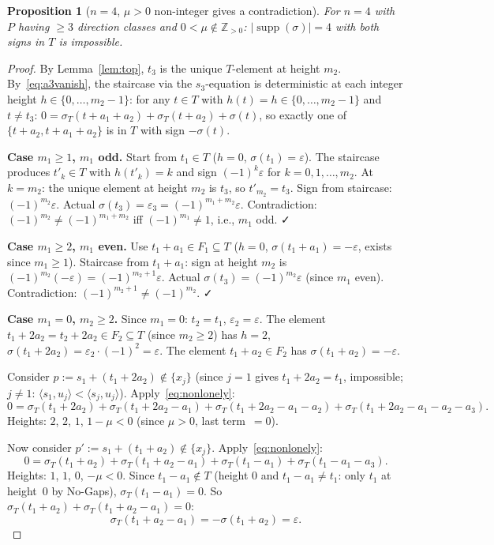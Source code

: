 \documentclass{article}
\newtheorem{prop}{Proposition}
\begin{document}
\begin{prop}[$n=4$, $\mu>0$ non-integer gives a contradiction]\label{prop:n4mu}
For $n=4$ with $P$ having $\ge 3$ direction classes and $0<\mu\notin\mathbb{Z}_{>0}$:
$|\operatorname{supp}(\sigma)|=4$ with both signs in $T$ is impossible.
\end{prop}
\begin{proof}
By Lemma~\ref{lem:top}, $t_3$ is the unique $T$-element at height $m_2$.
By~\eqref{eq:a3vanish}, the staircase via the $s_3$-equation
is deterministic at each integer height $h\in\{0,\dots,m_2-1\}$:
for any $t\in T$ with $h(t)=h\in\{0,\dots,m_2-1\}$ and $t\ne t_3$:
$0=\sigma_T(t+a_1+a_2)+\sigma_T(t+a_2)+\sigma(t)$,
so exactly one of $\{t+a_2,t+a_1+a_2\}$ is in $T$ with sign $-\sigma(t)$.

\textbf{Case $m_1\ge 1$, $m_1$ odd.}
Start from $t_1\in T$ ($h=0$, $\sigma(t_1)=\varepsilon$).
The staircase produces $t'_k\in T$ with $h(t'_k)=k$ and sign $(-1)^k\varepsilon$
for $k=0,1,\dots,m_2$.  At $k=m_2$: the unique element at height $m_2$ is $t_3$, so
$t'_{m_2}=t_3$.  Sign from staircase: $(-1)^{m_2}\varepsilon$.
Actual $\sigma(t_3)=\varepsilon_3=(-1)^{m_1+m_2}\varepsilon$.
Contradiction: $(-1)^{m_2}\ne(-1)^{m_1+m_2}$ iff $(-1)^{m_1}\ne 1$, i.e., $m_1$ odd. ✓

\textbf{Case $m_1\ge 2$, $m_1$ even.}
Use $t_1+a_1\in F_1\subseteq T$ ($h=0$, $\sigma(t_1+a_1)=-\varepsilon$, exists since $m_1\ge 1$).
Staircase from $t_1+a_1$: sign at height $m_2$ is $(-1)^{m_2}(-\varepsilon)=(-1)^{m_2+1}\varepsilon$.
Actual $\sigma(t_3)=(-1)^{m_2}\varepsilon$ (since $m_1$ even).
Contradiction: $(-1)^{m_2+1}\ne(-1)^{m_2}$. ✓

\textbf{Case $m_1=0$, $m_2\ge 2$.}
Since $m_1=0$: $t_2=t_1$, $\varepsilon_2=\varepsilon$.
The element $t_1+2a_2=t_2+2a_2\in F_2\subseteq T$ (since $m_2\ge 2$) has
$h=2$, $\sigma(t_1+2a_2)=\varepsilon_2\cdot(-1)^2=\varepsilon$.
The element $t_1+a_2\in F_2$ has $\sigma(t_1+a_2)=-\varepsilon$.

Consider $p:=s_1+(t_1+2a_2)\notin\{x_j\}$ (since $j=1$ gives $t_1+2a_2=t_1$, impossible;
$j\ne 1$: $\langle s_1,u_j\rangle<\langle s_j,u_j\rangle$).
Apply~\eqref{eq:nonlonely}:
\[
  0=\sigma_T(t_1+2a_2)+\sigma_T(t_1+2a_2-a_1)+\sigma_T(t_1+2a_2-a_1-a_2)
  +\sigma_T(t_1+2a_2-a_1-a_2-a_3).
\]
Heights: $2$, $2$, $1$, $1-\mu<0$ (since $\mu>0$, last term~$=0$).

Now consider $p':=s_1+(t_1+a_2)\notin\{x_j\}$.  Apply~\eqref{eq:nonlonely}:
\[
  0=\sigma_T(t_1+a_2)+\sigma_T(t_1+a_2-a_1)+\sigma_T(t_1-a_1)+\sigma_T(t_1-a_1-a_3).
\]
Heights: $1$, $1$, $0$, $-\mu<0$.
Since $t_1-a_1\notin T$ (height $0$ and $t_1-a_1\ne t_1$: only $t_1$ at height~$0$
by No-Gaps), $\sigma_T(t_1-a_1)=0$.
So $\sigma_T(t_1+a_2)+\sigma_T(t_1+a_2-a_1)=0$:
\begin{equation}\label{eq:la2}
\sigma_T(t_1+a_2-a_1)=-\sigma(t_1+a_2)=\varepsilon.
\end{equation}


\end{proof}
\end{document}

